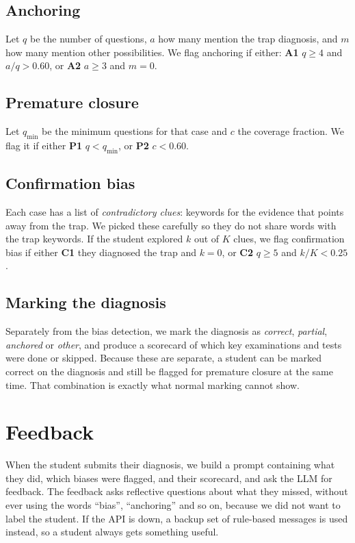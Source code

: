 \documentclass[conference]{IEEEtran}
\begin{document}
\subsection{Anchoring}
Let $q$ be the number of questions, $a$ how many mention the trap diagnosis, and
$m$ how many mention other possibilities. We flag anchoring if either:
\textbf{A1} $q \geq 4$ and $a/q > 0.60$, or \textbf{A2} $a \geq 3$ and $m = 0$.

\subsection{Premature closure}
Let $q_{\min}$ be the minimum questions for that case and $c$ the coverage
fraction. We flag it if either \textbf{P1} $q < q_{\min}$, or \textbf{P2}
$c < 0.60$.

\subsection{Confirmation bias}
Each case has a list of \emph{contradictory clues}: keywords for the evidence
that points away from the trap. We picked these carefully so they do not share
words with the trap keywords. If the student explored $k$ out of $K$ clues, we
flag confirmation bias if either \textbf{C1} they diagnosed the trap and $k = 0$,
or \textbf{C2} $q \geq 5$ and $k/K < 0.25$.

\subsection{Marking the diagnosis}
Separately from the bias detection, we mark the diagnosis as \emph{correct},
\emph{partial}, \emph{anchored} or \emph{other}, and produce a scorecard of which
key examinations and tests were done or skipped. Because these are separate, a
student can be marked correct on the diagnosis and still be flagged for premature
closure at the same time. That combination is exactly what normal marking cannot
show.

\section{Feedback}
When the student submits their diagnosis, we build a prompt containing what they
did, which biases were flagged, and their scorecard, and ask the LLM for
feedback. The feedback asks reflective questions about what they missed, without
ever using the words ``bias'', ``anchoring'' and so on, because we did not want
to label the student. If the API is down, a backup set of rule-based messages is
used instead, so a student always gets something useful.
\end{document}
